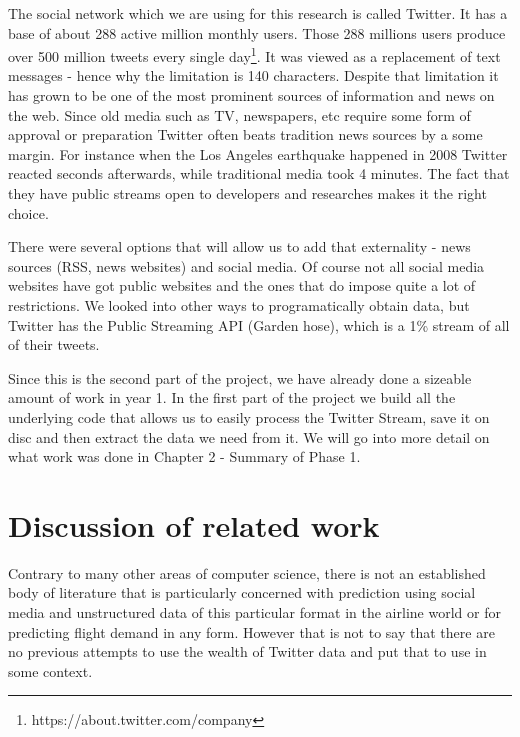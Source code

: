 \documentclass[minf,twoside,singlespacing,parskip,notimes,deptreport]{infthesis} %
\begin{document}
The social network which we are using for this research is called Twitter. 
It has a base of about 288 active million monthly users.
Those 288 millions users produce over 500 million tweets every single day\footnote{https://about.twitter.com/company}. 
It was viewed as a replacement of text messages - hence why the limitation is 140 characters.
Despite that limitation it has grown to be one of the most prominent sources of information and news on the web. 
Since old media such as TV, newspapers, etc require some form of approval or preparation Twitter often beats tradition news sources by a some margin. 
For instance when the Los Angeles earthquake happened in 2008\cite{TwitterNewsWire} Twitter reacted seconds afterwards, while traditional media took 4 minutes. 
The fact that they have public streams open to developers and researches makes it the right choice.


There were several options that will allow us to add that externality - news sources (RSS, news websites) and social media. 
Of course not all social media websites have got public websites and the ones that do impose quite a lot of restrictions. 
We looked into other ways to programatically obtain data, but Twitter has the Public Streaming API (Garden hose), which is a 1\% stream of all of their tweets. 


Since this is the second part of the project, we have already done a sizeable amount of work in year 1. 
In the first part of the project we build all the underlying code that allows us to easily process the Twitter Stream, save it on disc and then extract the data we need from it. 
We will go into more detail on what work was done in Chapter 2 - Summary of Phase 1. 


\section{Discussion of related work}

Contrary to many other areas of computer science, there is not an established body of literature that is particularly concerned with prediction using social media and unstructured data of this particular format in the airline world or for predicting flight demand in any form. 
However that is not to say that there are no previous attempts to use the wealth of Twitter data and put that to use in some context. 
\end{document}
